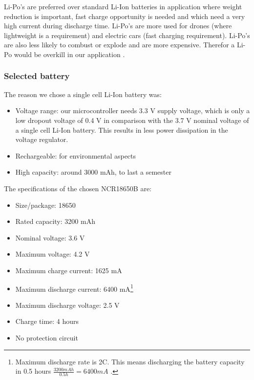 \documentclass[11pt,a4paper]{article}
\begin{document}
Li-Po's are preferred over standard Li-Ion batteries in application where weight reduction is important, fast charge opportunity is needed and which need a very high current during discharge time. Li-Po's are more used for drones (where lightweight is a requirement) and electric cars (fast charging requirement). Li-Po's are also less likely to combust or explode and are more expensive. Therefor a Li-Po would be overkill in our application \cite{LiIonVsLi-Po_Ovonic,LiIon_Wiki,Li-Po_Wiki}. 

\subsubsection{Selected battery}\label{sec:selected_battery}
The reason we chose a single cell Li-Ion battery was:
\begin{itemize}
	\item Voltage range: our microcontroller needs 3.3 V supply voltage, which is only a low dropout voltage of 0.4 V in comparison with the 3.7 V nominal voltage of a single cell Li-Ion battery. This results in less power dissipation in the voltage regulator. 
	\item Rechargeable: for environmental aspects
	\item High capacity: around 3000 mAh, to last a semester
\end{itemize}
The specifications of the chosen NCR18650B are:
\begin{itemize}
	\item Size/package: 18650
	\item Rated capacity: 3200 mAh
	\item Nominal voltage: 3.6 V
	\item Maximum voltage: 4.2 V
	\item Maximum charge current: 1625 mA
	\item Maximum discharge current: 6400 mA\footnote{Maximum discharge rate is 2C. This means discharging the battery capacity in 0.5 hours $\frac{3200 mAh}{0.5 h} = 6400 mA$ .} %
	\item Maximum discharge voltage: 2.5 V
	\item Charge time: 4 hours
	\item No protection circuit
\end{itemize}
\end{document}
